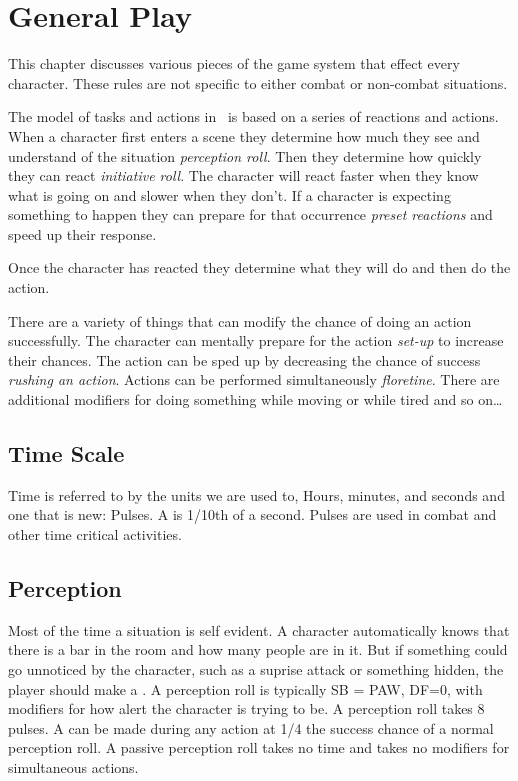 \chapter{General Play}

This chapter discusses various pieces of the game system that effect 
every character. These rules are not specific to either combat or 
non-combat situations.  

The model of tasks and actions in \SH\ is based on a series of 
reactions and actions. When a character first enters a scene
they determine how much they see and understand of the situation {\em 
perception roll}. Then they determine how quickly they can react {\em 
initiative roll}. The character will react faster when they know what 
is going on and slower when they don't. If a character is expecting 
something to happen they can prepare for that occurrence {\em preset 
reactions} and speed up their response. 

Once the character has reacted they determine what they will do and then 
do the action. 

There are a variety of things that can modify the chance of doing an 
action successfully. The character can mentally prepare for the 
action {\em set-up} to increase their chances. The action can be sped 
up by decreasing the chance of success {\em rushing an action}. 
Actions can be performed simultaneously {\em floretine}. There are 
additional modifiers for doing something while moving or while tired 
and so on\dots

\section{Time Scale}

Time is referred to by the units we are used to, Hours, minutes, and seconds 
and one that is new: Pulses. A  is 1/10th of a second. Pulses are
used in combat and other time critical activities.

\section{Perception}

Most of the time a situation is self evident. A character automatically
knows that there is a bar in the room and how many people are in it.
But if something could go unnoticed by the character, such as a suprise 
attack or something hidden, the player should make a . 
A perception roll is typically SB = PAW, DF=0, with modifiers for 
how alert the character is trying to be. A perception roll takes
8 pulses. A  can be made 
during any action at 1/4 the success chance of a normal perception roll. A
passive perception roll takes no time and takes no modifiers for 
simultaneous actions.

